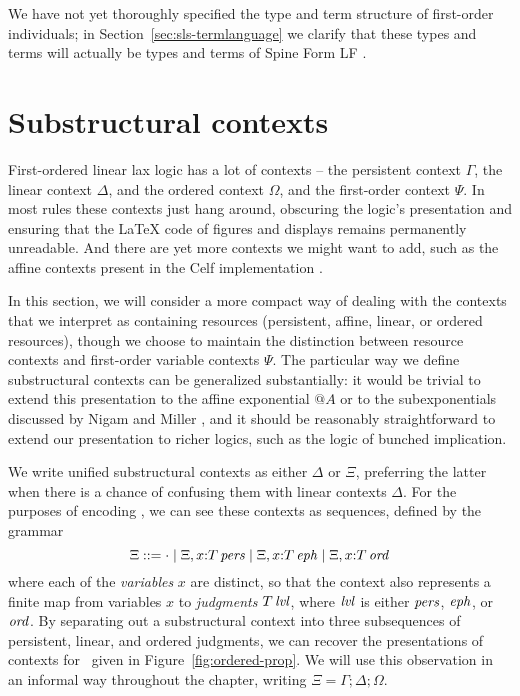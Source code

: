 We have not yet thoroughly specified the type and term structure of
first-order individuals; in Section~\ref{sec:sls-termlanguage} we
clarify that these types and terms will actually be types and terms of
Spine Form LF \cite{harper07mechanizing}.

\section{Substructural contexts}
\label{sec:contexts}

First-ordered linear lax logic has a lot of contexts -- the persistent
context $\Gamma$, the linear context $\Delta$, and the ordered context
$\Omega$, and the first-order context $\Psi$. In most rules
these contexts just hang around, obscuring the logic's presentation
and ensuring that the {\LaTeX} code of figures and displays remains
permanently unreadable. And there are yet more contexts we might want to 
add, such as the affine contexts present in the Celf implementation
\cite{schacknielsen08celf}.

In this section, we will consider a more compact way of dealing with
the contexts that we interpret as containing resources (persistent,
affine, linear, or ordered resources), though we choose to maintain
the distinction between resource contexts and first-order variable
contexts $\Psi$.  The particular way we define substructural contexts
can be generalized substantially: it would be trivial to extend this
presentation to the affine exponential ${@}A$ or to the subexponentials
discussed by Nigam and Miller \cite{nigam09algorithmic}, and it should
be reasonably straightforward to extend our presentation to richer
logics, such as the logic of bunched implication.

We write unified substructural contexts as either $\Delta$ or $\Xi$,
preferring the latter when there is a chance of confusing them with
linear contexts $\Delta$. For the purposes of encoding \ollll, we can
see these contexts as sequences, defined by the grammar
\[
\Xi ::= \cdot 
  \mid \Xi, x{:}{T}\,{{\it pers}}
  \mid \Xi, x{:}{T}\,{{\it eph}}
  \mid \Xi, x{:}{T}\,{{\it ord}}
\]
where each of the {\em variables} $x$ are distinct, so that the
context also represents a finite map from variables $x$ to {\it
  judgments} ${T}\,{{\it lvl}}$, where ${\it lvl}$ is either ${\it pers}$, ${\it eph}$,
or ${\it ord}$.  By separating out a substructural context into three
subsequences of persistent, linear, and ordered judgments, we can
recover the presentations of contexts for \ollll~given in
Figure~\ref{fig:ordered-prop}. We will use this observation in an
informal way throughout the chapter, writing $\Xi = \Gamma; \Delta;
\Omega$.

